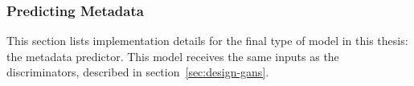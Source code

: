\subsubsection{Predicting Metadata}

This section lists implementation details for the final type of model
in this thesis: the metadata predictor. This model receives the same
inputs as the discriminators, described in
section~\ref{sec:design-gans}.


